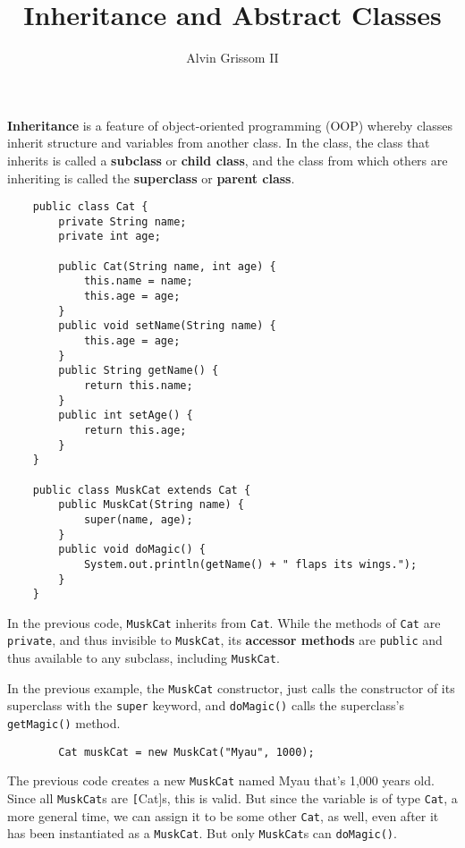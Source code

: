 \documentclass[11pt]{article}
\title{Inheritance and Abstract Classes}
\author{Alvin Grissom II}
\begin{document}
\maketitle

\textbf{Inheritance} is a feature of object-oriented programming (OOP) whereby classes inherit structure and variables from another class.  In the class, the class that inherits is called a \textbf{subclass} or \textbf{child class}, and the class from which others are inheriting is called the \textbf{superclass} or \textbf{parent class}.
\begin{verbatim}
    public class Cat {
        private String name;
        private int age;
        
        public Cat(String name, int age) {
        	this.name = name;
            this.age = age;
        }	       
        public void setName(String name) {
        	this.age = age;
        }        
        public String getName() {
        	return this.name;
        }
        public int setAge() {
        	return this.age;
        }
    }

    public class MuskCat extends Cat {
    	public MuskCat(String name) {
        	super(name, age);
        }
        public void doMagic() {
        	System.out.println(getName() + " flaps its wings.");
        }
    }
\end{verbatim}

In the previous code, \texttt{MuskCat} inherits from \texttt{Cat}.  While the methods of \texttt{Cat} are \texttt{private}, and thus invisible to \texttt{MuskCat}, its \textbf{accessor methods} are \texttt{public} and thus available to any subclass, including \texttt{MuskCat}.  

In the previous example, the \texttt{MuskCat} constructor, just calls the constructor of its superclass with the \texttt{super} keyword, and \texttt{doMagic()} calls the superclass's \texttt{getMagic()} method.

\begin{verbatim}
    	Cat muskCat = new MuskCat("Myau", 1000);
\end{verbatim}

The previous code creates a new \texttt{MuskCat} named Myau that's 1,000 years old.  Since all \texttt{MuskCat}s are \texttt[Cat]s, this is valid.  But since the variable is of type \texttt{Cat}, a more general time, we can assign it to be some other \texttt{Cat}, as well, even after it has been instantiated as a \texttt{MuskCat}.  But only \texttt{MuskCat}s can \texttt{doMagic()}.
\end{document}
